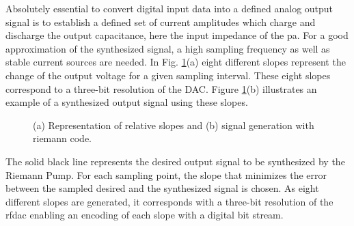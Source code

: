 \documentclass[journal]{IEEEtran}
\begin{document}
Absolutely essential to convert digital input data into a defined analog output signal is to establish a defined set of current amplitudes which charge and discharge the output capacitance, here the input impedance of the \gls{pa}.
For a good approximation of the synthesized signal, a high sampling frequency as well as stable current sources are needed.
In Fig. \ref{fig:SlopeSynthSignal}(a) eight different slopes represent the change of the output voltage for a given sampling interval.
These eight slopes correspond to a three-bit resolution of the DAC. 
Figure \ref{fig:SlopeSynthSignal}(b) illustrates an example of a synthesized output signal using these slopes.
%
\begin{figure}[htb]
  \centering
	\begin{scriptsize}
  	\def\svgwidth{\columnwidth}
 	 
  	\caption{(a) Representation of relative slopes and (b) signal generation with riemann code.}
  	\label{fig:SlopeSynthSignal}
	\end{scriptsize}
\end{figure}
%
The solid black line represents the desired output signal to be synthesized by the Riemann Pump.
For each sampling point, the slope that minimizes the error between the sampled desired and the synthesized signal is chosen.
As eight different slopes are generated, it corresponds with a three-bit resolution of the \gls{rfdac} enabling an encoding of each slope with a digital bit stream.
\end{document}
